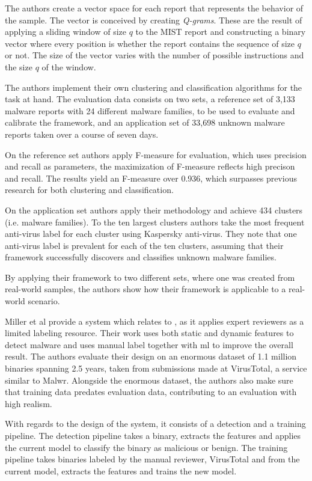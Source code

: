 \documentclass{llncs}
\begin{document}
The authors create a vector space for each report that represents the behavior of the sample. The vector is conceived by creating \textit{Q-grams}. These are the result of applying a sliding window of size $q$ to the MIST report and constructing a binary vector where every position is whether the report contains the sequence of size $q$ or not. The size of the vector varies with the number of possible instructions and the size $q$ of the window.

The authors implement their own clustering and classification algorithms for the task at hand. The evaluation data consists on two sets, a reference set of 3,133 malware reports with 24 different malware families, to be used to evaluate and calibrate the framework, and an application set of 33,698 unknown malware reports taken over a course of seven days.

On the reference set authors apply F-measure for evaluation, which uses precision and recall as parameters, the maximization of F-measure reflects high precison and recall. The results yield an F-measure over 0.936, which surpasses previous research for both clustering and classification.

On the application set authors apply their methodology and achieve 434 clusters (i.e. malware families). To the ten largest clusters authors take the most frequent anti-virus label for each cluster using Kaspersky anti-virus. They note that one anti-virus label is prevalent for each of the ten clusters, assuming that their framework successfully discovers and classifies unknown malware families.

By applying their framework to two different sets, where one was created from real-world samples, the authors show how their framework is applicable to a real-world scenario.

Miller et al\cite{miller:rev_int} provide a system which relates to \cite{nissim:al_pdf}, as it applies expert reviewers as a limited labeling resource. Their work uses both static and dynamic features to detect malware and uses manual label together with \gls{ml} to improve the overall result. The authors evaluate their design on an enormous dataset of 1.1 million binaries spanning 2.5 years, taken from submissions made at VirusTotal, a service similar to Malwr. Alongside the enormous dataset, the authors also make sure that training data predates evaluation data, contributing to an evaluation with high realism.

With regards to the design of the system, it consists of a detection and a training pipeline. The detection pipeline takes a binary, extracts the features and applies the current model to classify the binary as malicious or benign. The training pipeline takes binaries labeled by the manual reviewer, VirusTotal and from the current model, extracts the features and trains the new model.
\end{document}

